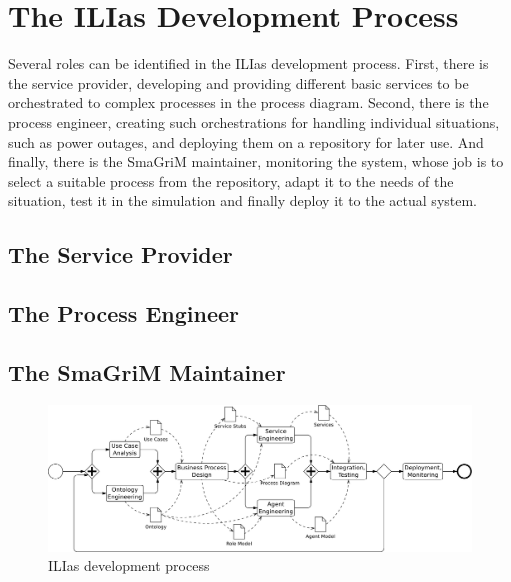 
\section{The ILIas Development Process}


Several roles can be identified in the ILIas development process.  First, there
is the service provider, developing and providing different basic services to be
orchestrated to complex processes in the process diagram.  Second, there is the
process engineer, creating such orchestrations for handling individual situations,
such as power outages, and deploying them on a repository for later use.  And
finally, there is the SmaGriM maintainer, monitoring the system, whose job is to
select a suitable process from the repository, adapt it to the needs of the
situation, test it in the simulation and finally deploy it to the actual system.


\subsection{The Service Provider}

\subsection{The Process Engineer}

\subsection{The SmaGriM Maintainer}


\begin{figure}
	\centering
	\includegraphics[width=\textwidth]{figures/methodology.pdf}
	\caption{ILIas development process}
	\label{fig:ilias-process}
\end{figure}



